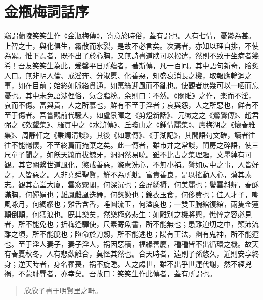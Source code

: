 \chapter*{金瓶梅詞話序}


竊謂蘭陵笑笑生作《金瓶梅傳》，寄意於時俗，蓋有謂也。人有七情，憂鬱為甚。上智之士，與化俱生，霧散而氷裂，是故不必言矣。次焉者，亦知以理自排，不使為累。惟下焉者，既不出了於心胸，又無詩書道腴可以撥遣，然則不致于坐病者幾希！吾友笑笑生為此，爰罄平日所蘊者，著斯傳，凡一百囘。其中語句新奇，膾炙人口。無非明人倫、戒淫奔、分淑慝、化善惡，知盛衰消長之機，取報應輪迴之事，如在目前；始終如脈絡貫通，如萬絲迎風而不亂也。使觀者庶幾可以一哂而忘憂也。其中未免語涉俚俗，氣含脂粉。余則曰：不然。《關雎》之作，楽而不淫，哀而不傷。富與貴，人之所慕也，鮮有不至于淫者；哀與怨，人之所惡也，鮮有不至于傷者。吾嘗觀前代騷人，如盧景暉之《剪燈新話》、元徽之之《鶯鶯傳》、趙君弼之《效顰集》、羅貫中之《水滸傳》、丘瓊山之《鍾情麗集》、盧梅湖之《懷春雅集》、周靜軒之《秉燭清談》，其後《如意傳》、《于湖記》，其間語句文確，讀者往往不能暢懷，不至終篇而掩棄之矣。此一傳者，雖市井之常談，閨房之碎語，使三尺童子聞之，如飫天漿而拔鯨牙，洞洞然易曉。雖不比古之集理趣，文墨綽有可觀。其它關繋世道風化，懲戒善惡，滌慮洗心，不無小補。譬如房中之事，人皆好之，人皆惡之。人非堯舜聖賢，鮮不為所躭。富貴善良，是以搖動人心，蕩其素志。觀其高堂大廈，雲窓霧閣，何深沉也；金屏綉褥，何美麗也；鬢雲斜軃，春酥滿胸，何嬋娟也；雄鳳雌凰迭舞，何慇懃也；錦衣玉食，何侈費也；佳人才子，嘲風咏月，何綢繆也；雞舌含香，唾圓流玉，何溢度也；一雙玉腕綰復綰，兩隻金蓮顛倒顛，何猛浪也。旣其樂矣，然樂極必悲生：如離别之機將興，憔悴之容必見者，所不能免也；折梅逢驛使，尺素寄魚書，所不能無也；患難迫切之中，顛沛流離之頃，所不能脫也；陷命於刀劔，所不能逃也；陽有王法，幽有鬼神，所不能逭也。至于淫人妻子，妻子淫人，祸因惡積，福緣善慶，種種皆不出循環之機。故天有春夏秋冬，人有悲歡離合，莫怪其然也。合天時者，遠則子孫悠久，近則安享終身；逆天時者，身名罹喪，祸不旋踵。人之䖏世，雖不出乎世運代謝，然不經兇祸，不蒙耻辱者，亦幸矣。吾故曰：笑笑生作此傳者，蓋有所謂也。

\begin{quotation}\begin{flushright}欣欣子書于明賢里之軒。\end{flushright}\end{quotation}


